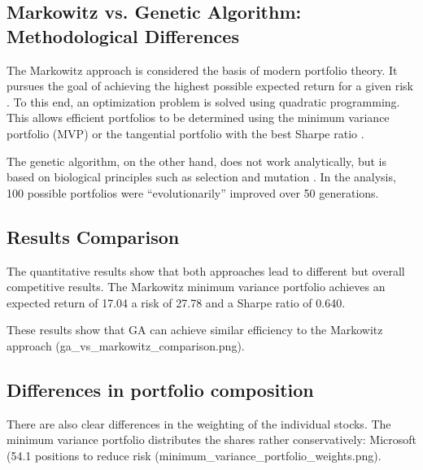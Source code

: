 \documentclass{agasthesis}
\begin{document}
\subsection{Markowitz vs. Genetic Algorithm: Methodological Differences}
The Markowitz approach is considered the basis of modern portfolio theory. It pursues the goal of achieving the highest possible expected return for a given risk \cite{mangram_simplified_2013}. 
To this end, an optimization problem is solved using quadratic programming. This allows efficient portfolios to be determined using the minimum variance portfolio (MVP) or the tangential 
portfolio with the best Sharpe ratio \cite{mangram_simplified_2013}.

The genetic algorithm, on the other hand, does not work analytically, but is based on biological principles such as selection and mutation \cite[p. 8-9]{melanie_introduction_1999}. 
In the analysis, 100 possible portfolios were “evolutionarily” improved over 50 generations.

\subsection{Results Comparison}
The quantitative results show that both approaches lead to different but overall competitive results. The Markowitz minimum variance portfolio achieves an expected return 
of 17.04%
a risk of 27.78%
and a Sharpe ratio of 0.640.

These results show that GA can achieve similar efficiency to the Markowitz approach (ga_vs_markowitz_comparison.png).

\subsection{Differences in portfolio composition}
There are also clear differences in the weighting of the individual stocks. The minimum variance portfolio distributes the shares rather conservatively: 
Microsoft (54.1%
positions to reduce risk (minimum_variance_portfolio_weights.png).
\end{document}
